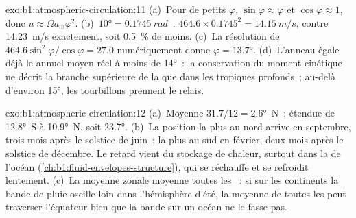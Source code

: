 \begin{solution}{exo:b1:atmospheric-circulation:11}
(a)~Pour de petits $\varphi$, $\sin\varphi \approx \varphi$ et $\cos\varphi \approx 1$,
donc $u \approx \Omega a_\oplus\varphi^2$. (b)~$\ang{10} = \qty{0.1745}{rad}$~:
$464.6 \times 0.1745^2 = \qty{14.15}{m/s}$, contre \qty{14.23}{m/s} exactement,
soit \qty{0.5}{\percent} de moins. (c)~La résolution de $464.6\sin^2\varphi/\cos\varphi = 27.0$
numériquement donne $\varphi = \ang{13.7}$. (d)~L'anneau égale déjà le 
annuel moyen réel à moins de \ang{14}~: la conservation du moment cinétique ne décrit la
branche supérieure de la  que dans les tropiques profonds~; au-delà d'environ
\ang{15}, les tourbillons prennent le relais.
\end{solution}

\begin{solution}{exo:b1:atmospheric-circulation:12}
(a)~Moyenne $31.7/12 = \ang{2.6}$~N~; étendue de \ang{12.8}~S à \ang{10.9}~N, soit
\ang{23.7}. (b)~La position la plus au nord arrive en septembre, trois mois après le
solstice de juin~; la plus au sud en février, deux mois après le solstice de décembre.
Le retard vient du stockage de chaleur, surtout dans la  de l'océan
(\cref{ch:b1:fluid-envelopes-structure}), qui se réchauffe et se refroidit lentement. (c)~La moyenne
zonale moyenne toutes les ~: si sur les continents la bande de pluie oscille loin
dans l'hémisphère d'été, la moyenne de toutes les  peut traverser l'équateur
bien que la bande sur un océan ne le fasse pas.
\end{solution}

